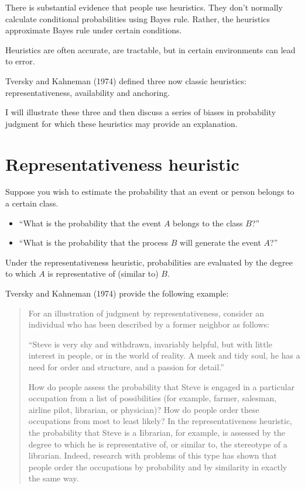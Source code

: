 \documentclass[
  letterpaper,
  DIV=11,
  numbers=noendperiod]{scrreprt}
\begin{document}
There is substantial evidence that people use heuristics. They don't
normally calculate conditional probabilities using Bayes rule. Rather,
the heuristics approximate Bayes rule under certain conditions.

Heuristics are often accurate, are tractable, but in certain
environments can lead to error.

Tversky and Kahneman (1974) defined three now classic heuristics:
representativeness, availability and anchoring.

I will illustrate these three and then discuss a series of biases in
probability judgment for which these heuristics may provide an
explanation.

\hypertarget{representativeness-heuristic}{%
\section{Representativeness
heuristic}\label{representativeness-heuristic}}

Suppose you wish to estimate the probability that an event or person
belongs to a certain class.

\begin{itemize}
\item
  ``What is the probability that the event \(A\) belongs to the class
  \(B\)?''
\item
  ``What is the probability that the process \(B\) will generate the
  event \(A\)?''
\end{itemize}

Under the representativeness heuristic, probabilities are evaluated by
the degree to which \(A\) is representative of (similar to) \(B\).

Tversky and Kahneman (1974) provide the following example:

\begin{quote}
For an illustration of judgment by representativeness, consider an
individual who has been described by a former neighbor as follows:

``Steve is very shy and withdrawn, invariably helpful, but with little
interest in people, or in the world of reality. A meek and tidy soul, he
has a need for order and structure, and a passion for detail.''

How do people assess the probability that Steve is engaged in a
particular occupation from a list of possibilities (for example, farmer,
salesman, airline pilot, librarian, or physician)? How do people order
these occupations from most to least likely? In the representativeness
heuristic, the probability that Steve is a Iibrarian, for example, is
assessed by the degree to which he is representative of, or similar to,
the stereotype of a librarian. Indeed, research with problems of this
type has shown that people order the occupations by probability and by
similarity in exactly the same way.
\end{quote}
\end{document}
